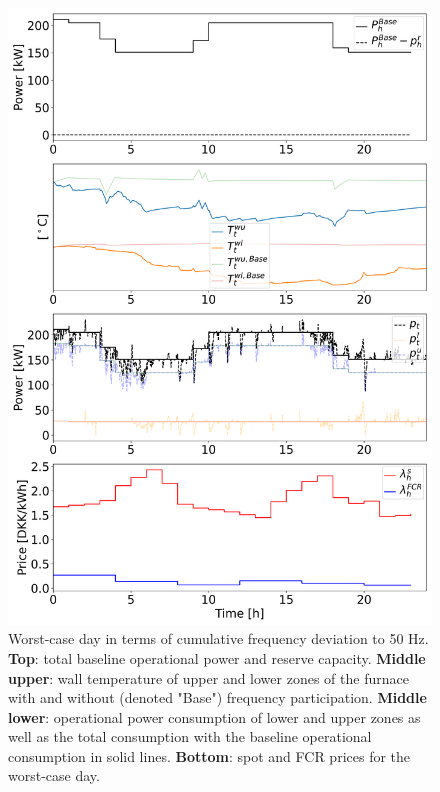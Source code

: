 \documentclass[sigconf]{acmart}
\begin{document}
\begin{figure}[t]
    \centering
    \includegraphics[width=\columnwidth]{figures/fcr_single_case.png}
    \caption{Worst-case day in terms of cumulative frequency deviation to 50 Hz. \textbf{Top}: total baseline operational power and reserve capacity. \textbf{Middle upper}: wall temperature of upper and lower zones of the furnace with and without (denoted "Base") frequency participation. \textbf{Middle lower}: operational power consumption of lower and upper zones as well as the total consumption with the baseline operational consumption in solid lines. \textbf{Bottom}: spot and FCR prices for the worst-case day.}
    \label{fig:fcr_single_case}
\end{figure}
\end{document}
